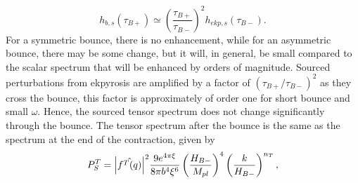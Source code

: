 \documentclass[12pt,a4paper]{article}
\numberwithin{equation}{section}
\numberwithin{equation}{section}
\begin{document}
\begin{equation}
   h_{b,s} (\tau_{B+})\simeq \left(\frac{\tau_{B+}}{\tau_{B-}}\right)^2 h_{ekp,s}(\tau_{B-})
    \label{eq:greenr}.
\end{equation}
For a symmetric bounce, there is no enhancement, while for an asymmetric bounce, there may be some change, but it will, in general, be small compared to the scalar spectrum that will be enhanced by orders of magnitude.
Sourced perturbations from ekpyrosis are amplified by a factor of $ (\tau_{B+}/\tau_{B-})^2$ as they cross the bounce, this factor is approximately of order one for short bounce and small $\omega$.  
Hence, the sourced tensor spectrum does not change significantly through the bounce. The tensor spectrum after the bounce is the same as the spectrum at the end of the contraction, given by \cite{r3,r4}
\begin{equation}
P^T_S  = \abs{\hat{f^T(q)}}^2  \frac{9 e^{4\pi \xi}}{8 \pi b^4 \xi^6} \left(\frac{H_{B-}}{M_{pl}}\right)^4 \left(\frac{k}{H_{B-}}\right)^{n_T},
\label{eq:ictspectrum}
\end{equation}
\end{document}
